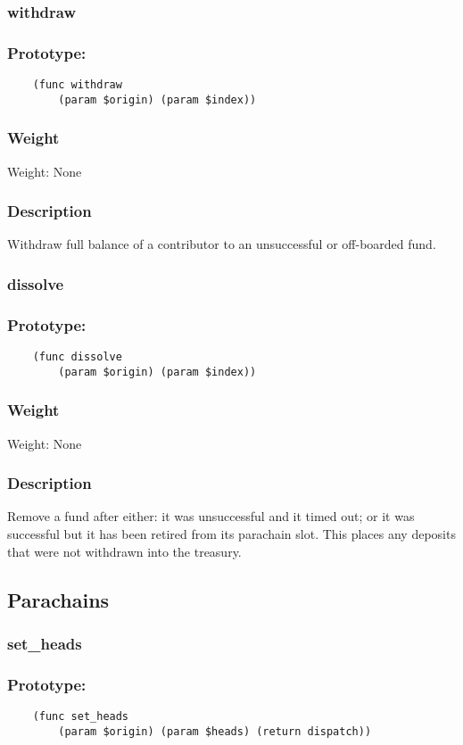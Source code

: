 \documentclass[11pt,a4paper]{article}
\begin{document}
\subsubsection{withdraw}
\subsubsection*{Prototype:}
\begin{verbatim}
    (func withdraw
        (param $origin) (param $index))
\end{verbatim}
\subsubsection*{Weight}
Weight: None
\subsubsection*{Description}
Withdraw full balance of a contributor to an unsuccessful or off-boarded fund.

\subsubsection{dissolve}
\subsubsection*{Prototype:}
\begin{verbatim}
    (func dissolve
        (param $origin) (param $index))
\end{verbatim}
\subsubsection*{Weight}
Weight: None
\subsubsection*{Description}
Remove a fund after either: it was unsuccessful and it timed out; or it was successful but it has been retired from its parachain slot. This places any deposits that were not withdrawn into the treasury.

\subsection{Parachains}
\subsubsection{set\_heads}
\subsubsection*{Prototype:}
\begin{verbatim}
    (func set_heads
        (param $origin) (param $heads) (return dispatch))
\end{verbatim}
\end{document}
